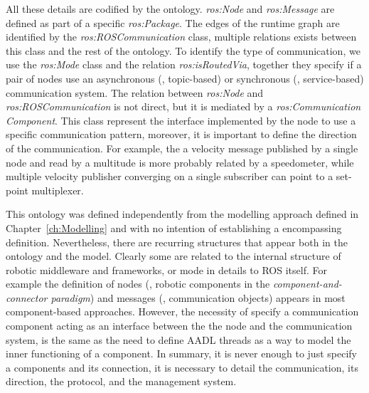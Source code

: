 All these details are codified by the ontology. \textit{ros:Node} and \textit{ros:Message} are defined as part of a specific \textit{ros:Package}. The edges of the runtime graph are identified by the \textit{ros:ROS\-Com\-mu\-ni\-ca\-tion} class, multiple relations exists between this class and the rest of the ontology. To identify the type of communication, we use the \textit{ros:Mode} class and the relation \textit{ros:isRoutedVia}, together they specify if a pair of nodes use an asynchronous (\ie, topic-based) or synchronous (\ie, service-based) communication system. The relation between \textit{ros:Node} and \textit{ros:ROS\-Com\-mu\-ni\-ca\-tion} is not direct, but it is mediated by a \textit{ros:Communication Component}. This class represent the interface implemented by the node to use a specific communication pattern, moreover, it is important to define the direction of the communication. For example, the a velocity message published by a single node and read by a multitude is more probably related by a speedometer, while multiple velocity publisher converging on a single subscriber can point to a set-point multiplexer.

This ontology was defined independently from the modelling approach defined in Chapter~\ref{ch:Modelling} and with no intention of establishing a encompassing definition. Nevertheless, there are recurring structures that appear both in the ontology and the  model. Clearly some are related to the internal structure of robotic middleware and frameworks, or mode in details to ROS itself. For example the definition of nodes (\ie, robotic components in the \textit{component-and-connector paradigm}) and messages (\ie, communication objects) appears in most component-based approaches. However, the necessity of specify a communication component acting as an interface between the the node and the communication system, is the same as the need to define AADL threads as a way to model the inner functioning of a component. In summary, it is never enough to just specify a components and its connection, it is necessary to detail the communication, its direction, the protocol, and the management system.

